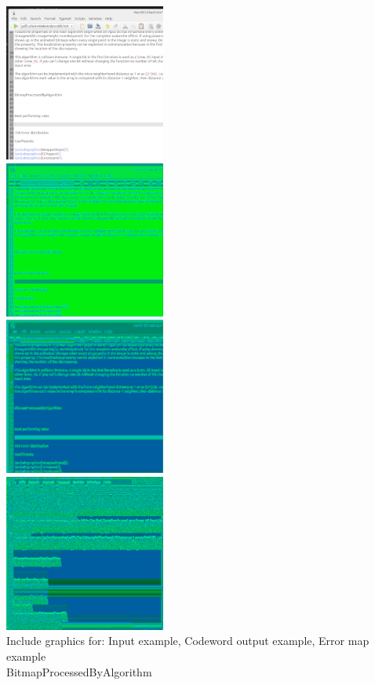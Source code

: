 \documentclass[11pt]{article}
\begin{document}
\includegraphics{testScreenshot}\\
\includegraphics{processedDepth1}\\
\includegraphics{processedDepth3}\\
\includegraphics{processedDepth6}\\
Include graphics for: Input example, Codeword output example, Error map example\\
BitmapProcessedByAlgorithm\\
\end{document}
